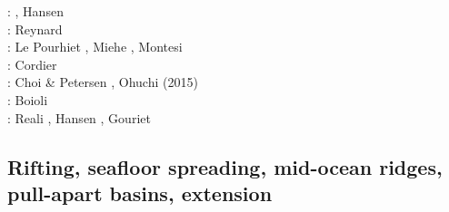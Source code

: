 \begin{scriptsize}
\twothousandeleven: \cite{lell11}\cite{kemk11}, Hansen \etal \cite{hazk11}\\
\twothousandtwelve: Reynard \cite{reyn12}\\
\twothousandthirteen: Le Pourhiet \cite{lepo13}, Miehe \etal \cite{miam13}, Montesi \cite{mont13}\\
\twothousandfourteen: Cordier \etal \cite{codb14}\\
\twothousandfifteen: Choi \& Petersen \cite{chpe15}, Ohuchi \etal (2015) \cite{ohkh15}\\
\twothousandseventeen: Boioli \etal \cite{bocc17}\\
\twothousandnineteen: Reali \etal \cite{rejv19}, Hansen \etal \cite{hakt19}, Gouriet \etal \cite{gocg19}
\end{scriptsize}

\subsection{Rifting, seafloor spreading, mid-ocean ridges, pull-apart basins, extension}

